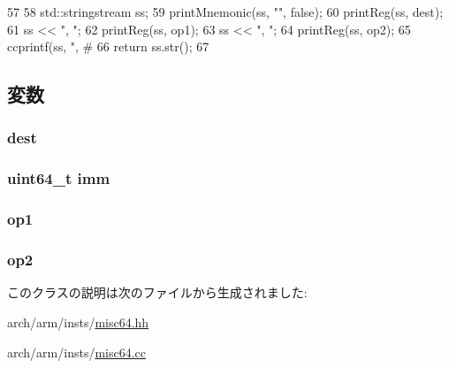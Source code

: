 \begin{DoxyCode}
57 {
58     std::stringstream ss;
59     printMnemonic(ss, "", false);
60     printReg(ss, dest);
61     ss << ", ";
62     printReg(ss, op1);
63     ss << ", ";
64     printReg(ss, op2);
65     ccprintf(ss, ", #%
66     return ss.str();
67 }
\end{DoxyCode}


\subsection{変数}
\hypertarget{classRegRegRegImmOp64_aec72e8e45bdc87abeeeb75d2a8a9a716}{
\subsubsection[{dest}]{ {\bf dest}}}
\label{classRegRegRegImmOp64_aec72e8e45bdc87abeeeb75d2a8a9a716}
\hypertarget{classRegRegRegImmOp64_a2b4406ad2843b5aa12d244d01d8fdc69}{
\subsubsection[{imm}]{\setlength{\rightskip}{0pt plus 5cm}uint64\_\-t {\bf imm}}}
\label{classRegRegRegImmOp64_a2b4406ad2843b5aa12d244d01d8fdc69}
\hypertarget{classRegRegRegImmOp64_a4c465c43ad568f8bcf8ae71480e9cfea}{
\subsubsection[{op1}]{ {\bf op1}}}
\label{classRegRegRegImmOp64_a4c465c43ad568f8bcf8ae71480e9cfea}
\hypertarget{classRegRegRegImmOp64_a7799ff6cbe5a252199059eb8665820e7}{
\subsubsection[{op2}]{ {\bf op2}}}
\label{classRegRegRegImmOp64_a7799ff6cbe5a252199059eb8665820e7}


このクラスの説明は次のファイルから生成されました:\begin{DoxyCompactItemize}
\item 
arch/arm/insts/\hyperlink{misc64_8hh}{misc64.hh}\item 
arch/arm/insts/\hyperlink{misc64_8cc}{misc64.cc}\end{DoxyCompactItemize}
